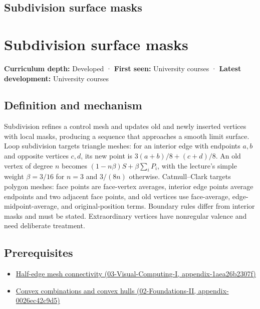 \hypertarget{appendix-0234ab7f86b1}{}
\section*{Subdivision surface masks}
\chapter{Subdivision surface masks}\label{appendix-0234ab7f86b1-subdivision-surface-masks}

\textbf{Curriculum depth:} Developed · \textbf{First seen:} University courses · \textbf{Latest development:} University courses

\section{Definition and mechanism}\label{appendix-0234ab7f86b1-definition-and-mechanism}

Subdivision refines a control mesh and updates old and newly inserted vertices with local masks, producing a sequence that approaches a smooth limit surface. Loop subdivision targets triangle meshes: for an interior edge with endpoints \(a,b\) and opposite vertices \(c,d\), its new point is \(3(a+b)/8+(c+d)/8\). An old vertex of degree \(n\) becomes \((1-n\beta)S+\beta\sum_iP_i\), with the lecture's simple weight \(\beta=3/16\) for \(n=3\) and \(3/(8n)\) otherwise. Catmull--Clark targets polygon meshes: face points are face-vertex averages, interior edge points average endpoints and two adjacent face points, and old vertices use face-average, edge-midpoint-average, and original-position terms. Boundary rules differ from interior masks and must be stated. Extraordinary vertices have nonregular valence and need deliberate treatment.

\section{Prerequisites}\label{appendix-0234ab7f86b1-prerequisites}

\begin{itemize}
\tightlist
\item
  \href{../03-Visual-Computing-I/main.pdf\#nameddest=appendix-1aea26b2307f}{Half-edge mesh connectivity (03-Visual-Computing-I, appendix-1aea26b2307f)}
\item
  \href{../02-Foundations-II/main.pdf\#nameddest=appendix-0026ec42c9d5}{Convex combinations and convex hulls (02-Foundations-II, appendix-0026ec42c9d5)}
\end{itemize}

